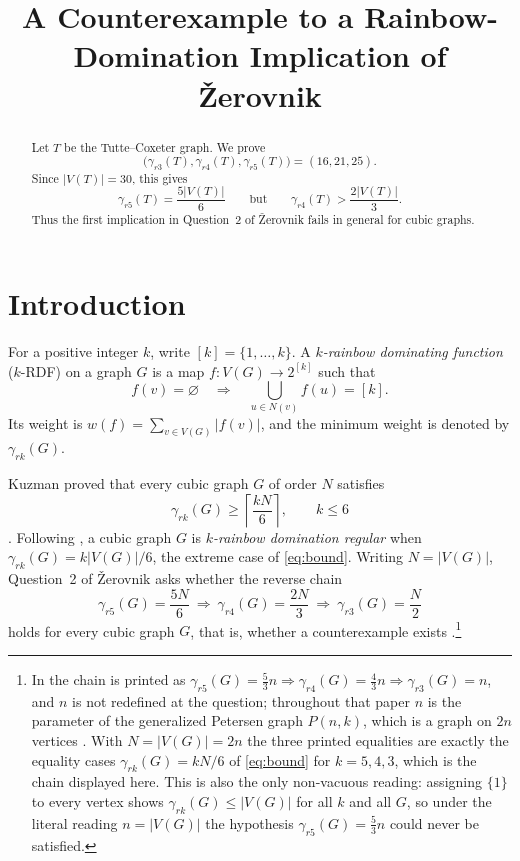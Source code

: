\documentclass[11pt]{amsart}
\title[A rainbow-domination counterexample]
      {A Counterexample to a Rainbow-Domination Implication of \v{Z}erovnik}
\date{}
\begin{document}
\begin{abstract}
Let $T$ be the Tutte--Coxeter graph. We prove
\[
  \bigl(\gamma_{r3}(T),\gamma_{r4}(T),\gamma_{r5}(T)\bigr)
  =(16,21,25).
\]
Since $|V(T)|=30$, this gives
\[
  \gamma_{r5}(T)=\frac{5|V(T)|}{6}
  \qquad\text{but}\qquad
  \gamma_{r4}(T)>\frac{2|V(T)|}{3}.
\]
Thus the first implication in Question~2 of \v{Z}erovnik fails in
general for cubic graphs.
\end{abstract}

\maketitle

\section{Introduction}

For a positive integer $k$, write $[k]=\{1,\ldots,k\}$. A
\emph{$k$-rainbow dominating function} ($k$-RDF) on a graph $G$ is a
map $f\colon V(G)\to 2^{[k]}$ such that
\[
  f(v)=\varnothing
  \quad\Longrightarrow\quad
  \bigcup_{u\in N(v)} f(u)=[k].
\]
Its weight is $w(f)=\sum_{v\in V(G)}|f(v)|$, and the minimum weight is
denoted by $\gamma_{rk}(G)$.

Kuzman proved that every cubic graph $G$ of order $N$ satisfies
\begin{equation}\label{eq:bound}
  \gamma_{rk}(G)\geq \left\lceil\frac{kN}{6}\right\rceil,
  \qquad k\leq 6
\end{equation}
\cite[Theorem~1.2]{Kuzman2020}. Following \cite{Kuzman2025}, a cubic
graph $G$ is \emph{$k$-rainbow domination regular} when
$\gamma_{rk}(G)=k|V(G)|/6$, the extreme case of \eqref{eq:bound}.
Writing $N=|V(G)|$, Question~2 of
\v{Z}erovnik asks whether the reverse chain
\[
  \gamma_{r5}(G)=\frac{5N}{6}
  \ \Longrightarrow\
  \gamma_{r4}(G)=\frac{2N}{3}
  \ \Longrightarrow\
  \gamma_{r3}(G)=\frac{N}{2}
\]
holds for every cubic graph $G$, that is, whether a counterexample
exists \cite[Question~2]{Zerovnik2024}.\footnote{In
\cite[Question~2]{Zerovnik2024} the chain is printed as
$\gamma_{r5}(G)=\frac{5}{3}n\Rightarrow\gamma_{r4}(G)=\frac{4}{3}n
\Rightarrow\gamma_{r3}(G)=n$, and $n$ is not redefined at the question;
throughout that paper $n$ is the parameter of the generalized Petersen
graph $P(n,k)$, which is a graph on $2n$ vertices
\cite[p.~443]{Zerovnik2024}. With $N=|V(G)|=2n$ the three printed
equalities are exactly the equality cases $\gamma_{rk}(G)=kN/6$ of
\eqref{eq:bound} for $k=5,4,3$, which is the chain displayed here. This
is also the only non-vacuous reading: assigning $\{1\}$ to every vertex
shows $\gamma_{rk}(G)\leq|V(G)|$ for all $k$ and all $G$, so under the
literal reading $n=|V(G)|$ the hypothesis $\gamma_{r5}(G)=\frac{5}{3}n$
could never be satisfied.}
\end{document}
